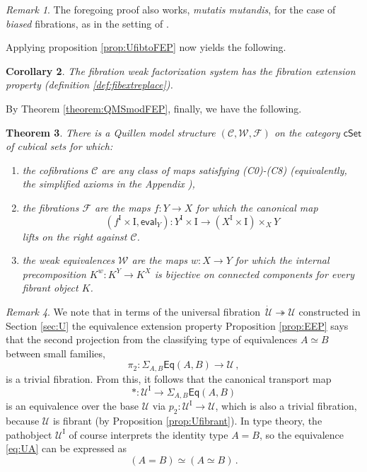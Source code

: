 \documentclass[11pt]{amsart}
\newcommand{\CC}{\ensuremath{\mathcal{C}}}
\newcommand{\WW}{\ensuremath{\mathcal{W}}}
\newcommand{\FF}{\ensuremath{\mathcal{F}}}
\newcommand{\cSet}{\ensuremath{\mathsf{cSet}}}
\newcommand{\eval}{\ensuremath{\mathsf{eval}}}%
\newcommand{\ra}{\ensuremath{\rightarrow}}
\newcommand{\fib}{\ensuremath{\twoheadrightarrow}}
\renewcommand{\to}{\ensuremath{\rightarrow}}
\newcommand{\too}{\ensuremath{\longrightarrow}}
\newcommand{\I}{\ensuremath{\mathrm{I}}}
\newcommand{\U}{\ensuremath{\mathcal{U}}}
\newcommand{\UU}{\ensuremath{\,\dot{\mathcal{U}}}}
\newtheorem{theorem}{Theorem}
\newtheorem{corollary}[theorem]{Corollary}
\theoremstyle{remark}
\newtheorem{remark}[theorem]{Remark}
\theoremstyle{definition}
\begin{document}
\begin{remark}
The foregoing proof also works, \emph{mutatis mutandis}, for the case of \emph{biased} fibrations, as in the setting of \cite{CCHM}.
\end{remark}

Applying proposition \ref{prop:UfibtoFEP} now yields the following.

\begin{corollary}\label{cor:FEP}
The fibration weak factorization system has the fibration extension property (definition \ref{def:fibextreplace}). 
\end{corollary}

By Theorem \ref{theorem:QMSmodFEP}, finally, we have the following.

\begin{theorem}\label{theorem:QMS}
There is a Quillen model structure $(\CC,\WW,\FF)$ on the category $\cSet$ of cubical sets for which:
\begin{enumerate}
\item the cofibrations $\CC$ are any class of maps satisfying (C0)-(C8) (equivalently, the simplified axioms in the Appendix%
),
\item the fibrations $\FF$ are the maps $f : Y\ra X$ for which the canonical map 
\[
(f^\I \times \I, \eval_Y) : Y^\I \times \I\too (X^\I \times \I)\times_X Y
\]
lifts on the right against $\CC$.
\item the weak equivalences $\WW$ are the maps $w : X\ra Y$  for which the internal precomposition $K^w : K^Y \to K^X$ is bijective on connected components for every fibrant object $K$.
\end{enumerate}
\end{theorem}


\begin{remark}
We note that in terms of the universal fibration $\UU\fib\U$ constructed in Section \ref{sec:U} the equivalence extension property Proposition \ref{prop:EEP} says that the second projection from the classifying type of equivalences $A\simeq B$ between small families, 
\[
\pi_2 : \Sigma_{A,B}\mathsf{Eq}(A,B) \too \U \,,
\]
is a trivial fibration.  From this, it follows that the canonical transport map 
\begin{equation}\label{eq:UA}
* : \U^\I \too \Sigma_{A,B}\mathsf{Eq}(A,B)
\end{equation}
 is an equivalence over the base $\U$ via $p_2: \U^\I \to \U$, which is also a trivial fibration, because $\U$ is fibrant (by Proposition \ref{prop:Ufibrant}).  In type theory, the pathobject $\U^\I$ of course interprets the identity type $A=B$, so the equivalence \eqref{eq:UA} can be expressed as $$(A=B)\simeq(A\simeq B)\,.$$\end{remark}
\end{document}
